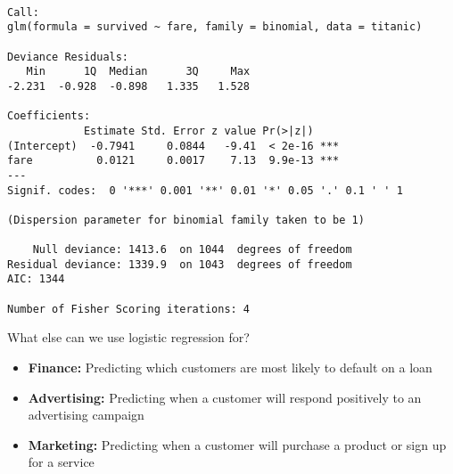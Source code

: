 \documentclass{beamer}\usepackage[]{graphicx}\usepackage[]{color}
\makeatletter
\newenvironment{kframe}{%
 \def\at@end@of@kframe{}%
 \ifinner\ifhmode%
  \def\at@end@of@kframe{\end{minipage}}%
  \begin{minipage}{\columnwidth}%
 \fi\fi%
 \def\FrameCommand##1{\hskip\@totalleftmargin \hskip-\fboxsep
 \colorbox{shadecolor}{##1}\hskip-\fboxsep
     \hskip-\linewidth \hskip-\@totalleftmargin \hskip\columnwidth}%
 \MakeFramed {\advance\hsize-\width
   \@totalleftmargin\z@ \linewidth\hsize
   \@setminipage}}%
 {\par\unskip\endMakeFramed%
 \at@end@of@kframe}
\newenvironment{knitrout}{}{} %
\makeatother
\begin{document}
\begin{darkframes}
    \begin{frame}[fragile]
      \fontsize{9}{9}\selectfont
\begin{knitrout}
\begin{kframe}
\begin{verbatim}

Call:
glm(formula = survived ~ fare, family = binomial, data = titanic)

Deviance Residuals: 
   Min      1Q  Median      3Q     Max  
-2.231  -0.928  -0.898   1.335   1.528  

Coefficients:
            Estimate Std. Error z value Pr(>|z|)    
(Intercept)  -0.7941     0.0844   -9.41  < 2e-16 ***
fare          0.0121     0.0017    7.13  9.9e-13 ***
---
Signif. codes:  0 '***' 0.001 '**' 0.01 '*' 0.05 '.' 0.1 ' ' 1

(Dispersion parameter for binomial family taken to be 1)

    Null deviance: 1413.6  on 1044  degrees of freedom
Residual deviance: 1339.9  on 1043  degrees of freedom
AIC: 1344

Number of Fisher Scoring iterations: 4
\end{verbatim}
\end{kframe}
\end{knitrout}
    \end{frame}

    \begin{frame}{What else can we use logistic regression for?}
      \begin{itemize}
        \item \textbf{Finance:} Predicting which customers are most likely to default on a loan
        \item \textbf{Advertising:} Predicting when a customer will respond positively to an advertising campaign
        \item \textbf{Marketing:} Predicting when a customer will purchase a product or sign up for a service
      \end{itemize}
    \end{frame}
  \end{darkframes}
\end{document}
